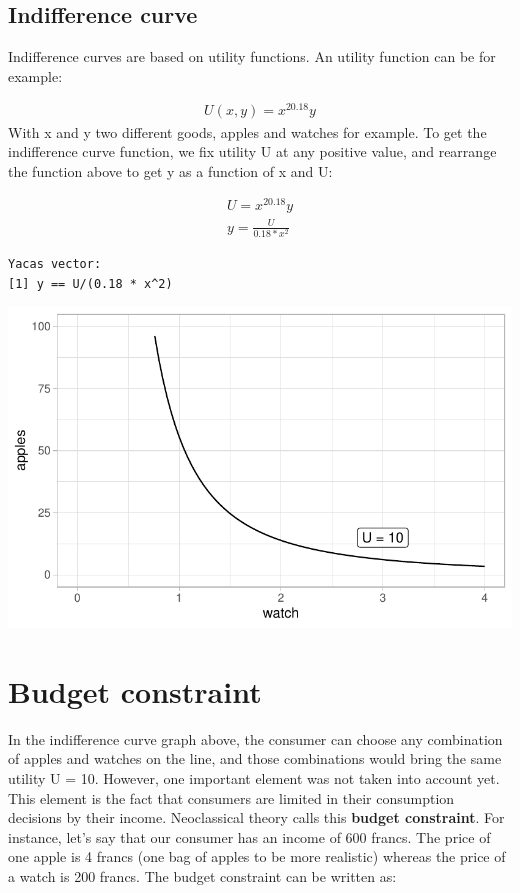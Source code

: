 \documentclass[
  letterpaper,
  DIV=11,
  numbers=noendperiod]{scrreprt}
\begin{document}
\hypertarget{indifference-curve}{%
\subsection{Indifference curve}\label{indifference-curve}}

Indifference curves are based on utility functions. An utility function
can be for example:

\[
\begin{aligned}
U(x,y)=x^20.18y
\end{aligned}
\] With x and y two different goods, apples and watches for example. To
get the indifference curve function, we fix utility U at any positive
value, and rearrange the function above to get y as a function of x and
U:

\[
\begin{aligned}
U = x^20.18y
\\
y = \frac{U}{0.18*x^2}
\end{aligned}
\]

\begin{verbatim}
Yacas vector:
[1] y == U/(0.18 * x^2)
\end{verbatim}

\includegraphics{consumer-theory_files/figure-pdf/unnamed-chunk-7-1.pdf}

\hypertarget{budget-constraint}{%
\section{Budget constraint}\label{budget-constraint}}

In the indifference curve graph above, the consumer can choose any
combination of apples and watches on the line, and those combinations
would bring the same utility U = 10. However, one important element was
not taken into account yet. This element is the fact that consumers are
limited in their consumption decisions by their income. Neoclassical
theory calls this \textbf{budget constraint}. For instance, let's say
that our consumer has an income of 600 francs. The price of one apple is
4 francs (one bag of apples to be more realistic) whereas the price of a
watch is 200 francs. The budget constraint can be written as:
\end{document}
